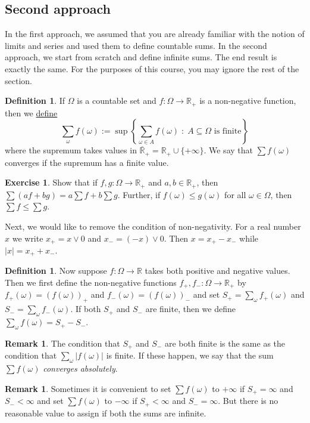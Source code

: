 \documentclass[preprint,  11pt]{amsart}
\theoremstyle{plain} %
\theoremstyle{definition} %
\newtheorem{definition}[theorem]{Definition}
\newtheorem{exercise}[theorem]{Exercise}
\newtheorem{remark}[theorem]{Remark}
\begin{document}
{{{{{{{{{{{\subsection{Second approach} In the first approach, we assumed that you are already familiar with the notion of limits and series and used them to define countable sums. In the second approach, we start from scratch and define infinite sums. The end result is exactly the same. For the purposes of this course, you may ignore the rest of the section.
\begin{definition} If $\Omega$ is a countable set and $f:\Omega \rightarrow \mathbb{R}_{+}$ is a non-negative function, then we \underline{define}
$$
\sum\limits_{\omega}f(\omega) :=\sup\left\{\sum\limits_{\omega\in A}f(\omega) {\; : \;} A\subseteq \Omega \mbox{ is finite}\right\}
$$
where the supremum takes values in $\overline{\mathbb{R}}_{+}=\mathbb{R}_{+}\cup\{+\infty\}$. We say that $\sum f(\omega)$ converges if the supremum has a finite value.
\end{definition}
\begin{exercise} Show that if $f,g:\Omega\rightarrow \mathbb{R}_{+}$ and $a,b\in \mathbb{R}_{+}$, then  $\sum (af+bg) = a\sum f +b\sum g$. Further, if $f(\omega)\le g(\omega)$ for all $\omega\in \Omega$, then $\sum f \le \sum g$.
\end{exercise}


Next, we would like to remove the condition of non-negativity. For a real number $x$ we write $x_{+}=x\vee 0$ and $x_{-}=(-x)\vee 0$. Then $x=x_{+}-x_{-}$ while $|x|=x_{+}+x_{-}$.
\begin{definition} Now suppose $f:\Omega\rightarrow \mathbb{R}$ takes both positive and negative values. Then we first define the non-negative functions $f_{+},f_{-}:\Omega\rightarrow \mathbb{R}_{+}$ by $f_{+}(\omega)=(f(\omega))_{+}$ and $f_{-}(\omega)=(f(\omega))_{-}$ and set $S_{+}=\sum_{\omega}f_{+}(\omega)$ and $S_{-}=\sum_{\omega}f_{-}(\omega)$. If both $S_{+}$ and $S_{-}$ are finite, then we define $\sum_{\omega}f(\omega)= S_{+}-S_{-}$.
\end{definition}
\begin{remark} The condition that $S_{+}$ and $S_{-}$ are both finite is the same as the condition that $\sum_{\omega}|f(\omega)|$ is finite. If these happen,  we say that the sum $\sum f(\omega)$ {\em converges absolutely}.
\end{remark}
\begin{remark} Sometimes it is convenient to set $\sum f(\omega)$ to $+\infty$ if  $S_{+}=\infty$ and $S_{-}<\infty$ and set $\sum f(\omega)$ to $-\infty$ if $S_{+}<\infty$ and $S_{-}=\infty$. But there is no reasonable value to assign if both the sums are infinite.
\end{remark}

}}}}}}}}}}}
\end{document}
